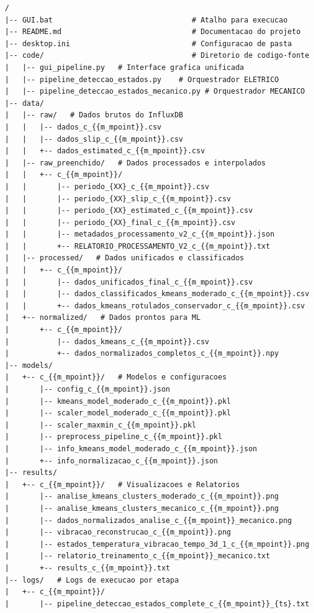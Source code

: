 {\scriptsize
    \begin{verbatim}
/
|-- GUI.bat                                # Atalho para execucao
|-- README.md                              # Documentacao do projeto
|-- desktop.ini                            # Configuracao de pasta
|-- code/                                  # Diretorio de codigo-fonte
|   |-- gui_pipeline.py   # Interface grafica unificada
|   |-- pipeline_deteccao_estados.py    # Orquestrador ELETRICO
|   |-- pipeline_deteccao_estados_mecanico.py # Orquestrador MECANICO
|-- data/
|   |-- raw/   # Dados brutos do InfluxDB
|   |   |-- dados_c_{{m_mpoint}}.csv
|   |   |-- dados_slip_c_{{m_mpoint}}.csv
|   |   +-- dados_estimated_c_{{m_mpoint}}.csv
|   |-- raw_preenchido/   # Dados processados e interpolados
|   |   +-- c_{{m_mpoint}}/
|   |       |-- periodo_{XX}_c_{{m_mpoint}}.csv
|   |       |-- periodo_{XX}_slip_c_{{m_mpoint}}.csv
|   |       |-- periodo_{XX}_estimated_c_{{m_mpoint}}.csv
|   |       |-- periodo_{XX}_final_c_{{m_mpoint}}.csv
|   |       |-- metadados_processamento_v2_c_{{m_mpoint}}.json
|   |       +-- RELATORIO_PROCESSAMENTO_V2_c_{{m_mpoint}}.txt
|   |-- processed/   # Dados unificados e classificados
|   |   +-- c_{{m_mpoint}}/
|   |       |-- dados_unificados_final_c_{{m_mpoint}}.csv
|   |       |-- dados_classificados_kmeans_moderado_c_{{m_mpoint}}.csv
|   |       +-- dados_kmeans_rotulados_conservador_c_{{m_mpoint}}.csv
|   +-- normalized/   # Dados prontos para ML
|       +-- c_{{m_mpoint}}/
|           |-- dados_kmeans_c_{{m_mpoint}}.csv
|           +-- dados_normalizados_completos_c_{{m_mpoint}}.npy
|-- models/
|   +-- c_{{m_mpoint}}/   # Modelos e configuracoes
|       |-- config_c_{{m_mpoint}}.json
|       |-- kmeans_model_moderado_c_{{m_mpoint}}.pkl
|       |-- scaler_model_moderado_c_{{m_mpoint}}.pkl
|       |-- scaler_maxmin_c_{{m_mpoint}}.pkl
|       |-- preprocess_pipeline_c_{{m_mpoint}}.pkl
|       |-- info_kmeans_model_moderado_c_{{m_mpoint}}.json
|       +-- info_normalizacao_c_{{m_mpoint}}.json
|-- results/
|   +-- c_{{m_mpoint}}/   # Visualizacoes e Relatorios
|       |-- analise_kmeans_clusters_moderado_c_{{m_mpoint}}.png
|       |-- analise_kmeans_clusters_mecanico_c_{{m_mpoint}}.png
|       |-- dados_normalizados_analise_c_{{m_mpoint}}_mecanico.png
|       |-- vibracao_reconstrucao_c_{{m_mpoint}}.png
|       |-- estados_temperatura_vibracao_tempo_3d_1_c_{{m_mpoint}}.png
|       |-- relatorio_treinamento_c_{{m_mpoint}}_mecanico.txt
|       +-- results_c_{{m_mpoint}}.txt
|-- logs/   # Logs de execucao por etapa
|   +-- c_{{m_mpoint}}/
|       |-- pipeline_deteccao_estados_complete_c_{{m_mpoint}}_{ts}.txt

\end{verbatim}}
